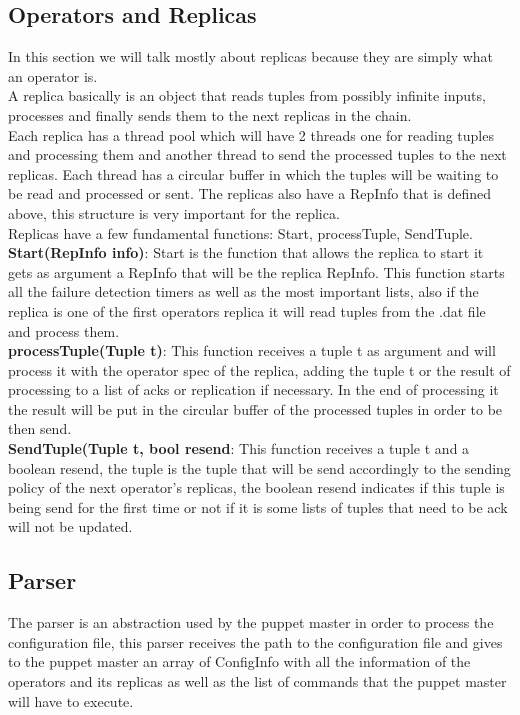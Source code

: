 \documentclass[times, 10pt, twocolumn]{article}
\begin{document}
\subsection{Operators and Replicas}
In this section we will talk mostly about replicas because they are simply what an operator is.
\\A replica basically is an object that reads tuples from possibly infinite inputs, processes and finally sends them to the next replicas in the chain.
\\Each replica has a thread pool which will have 2 threads one for reading tuples and processing them and another thread to send the processed tuples to the next replicas. Each thread has a circular buffer in which the tuples will be waiting to be read and processed or sent. The replicas also have a RepInfo that is defined above, this structure is very important for the replica.
\\Replicas have a few fundamental functions: Start, processTuple, SendTuple.
\\\textbf{Start(RepInfo info)}: Start is the function that allows the replica to start it gets as argument a RepInfo that will be the replica RepInfo. This function starts all the failure detection timers as well as the most important lists, also if the replica is one of the first operators replica it will read tuples from the .dat file and process them.
\\\textbf{processTuple(Tuple t)}: This function receives a tuple t as argument and will process it with the operator spec of the replica, adding the tuple t or the result of processing to a list of acks or replication if necessary. In the end of processing it the result will be put in the circular buffer of the processed tuples in order to be then send.
\\\textbf{SendTuple(Tuple t, bool resend}: This function receives a tuple t and a boolean resend, the tuple is the tuple that will be send accordingly to the sending policy of the next operator's replicas, the boolean resend indicates if this tuple is being send for the first time or not if it is some lists of tuples that need to be ack will not be updated.



\subsection{Parser}
The parser is an abstraction used by the puppet master in order to process the configuration file, this parser receives the path to the configuration file and gives to the puppet master an array of ConfigInfo with all the information of the operators and its replicas as well as the list of commands that the puppet master will have to execute.
\end{document}
